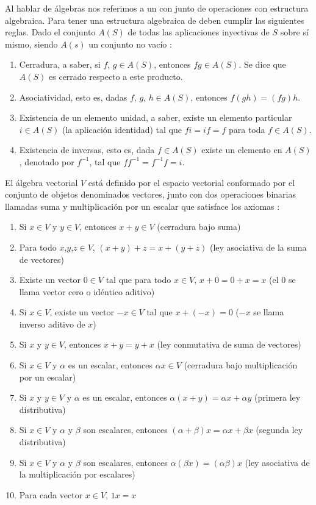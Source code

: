Al hablar de álgebras nos referimos a un con junto de operaciones con estructura algebraica. Para tener una estructura algebraica de deben cumplir las siguientes reglas. Dado el conjunto $A(S)$ de todas las aplicaciones inyectivas de $S$ sobre sí mismo, siendo $A(s)$ un conjunto no vacío \cite{herstein1988algebra}:

\begin{enumerate}
	\item Cerradura, a saber, si $f$, $g \in A(S)$, entonces $fg \in A(S)$. Se dice que $A(S)$ es cerrado respecto a este producto.
	\item Asociatividad, esto es, dadas $f$, $g$, $h \in A(S)$, entonces $f(gh) = (fg)h$.
	\item Existencia de un elemento unidad, a saber, existe un elemento	particular $i \in A(S)$ (la aplicación identidad) tal que $fi = if = f$ para toda $f \in A (S)$.
	\item Existencia de inversas, esto es, dada $f \in A(S)$ existe un elemento en $A(S)$, denotado por $f^{-1}$, tal que $ff^{-1} = f^{-1}f = i$. 
\end{enumerate}


El álgebra vectorial $V$ está definido por el espacio vectorial conformado por el conjunto de objetos denominados vectores, junto con dos operaciones binarias llamadas suma y multiplicación por un escalar que satisface los axiomas \cite{grossman2008algebra}:

\begin{enumerate}
	\item Si $x \in V$ y $y \in V$, entonces $x+y \in V$ (cerradura bajo suma)
	\item Para todo $x$,$y$,$z \in V$, $(x+y)+z=x+(y+z)$ (ley asociativa de la suma de vectores)
	\item Existe un vector $0 \in V$ tal que para todo $x \in V$, $x+0=0+x=x$ (el $0$ se llama vector cero o idéntico aditivo)
	\item Si $x \in V$, existe un vector $-x \in V$ tal que $x+(-x)=0$ ($-x$ se llama inverso aditivo de $x$)
	\item Si $x$ y $y \in V$, entonces $x+y=y+x$ (ley conmutativa de suma de vectores)
	\item Si $x \in V$ y $\alpha$ es un escalar, entonces $\alpha x \in V$ (cerradura bajo multiplicación por un escalar)
	\item Si $x$ y $y \in V$ y $\alpha$ es un escalar, entonces $\alpha(x+y) =\alpha x+ \alpha y$ (primera ley distributiva)
	\item Si $x \in V$ y $\alpha$ y $\beta$ son escalares, entonces $(\alpha+\beta)x= \alpha x+ \beta x$ (segunda ley distributiva)
	\item Si $x \in V$ y $\alpha$ y $\beta$ son escalares, entonces $\alpha(\beta x)=(\alpha \beta)x$
	(ley asociativa de la multiplicación por escalares)
	\item Para cada vector $x \in V$, $1x=x$
\end{enumerate}


